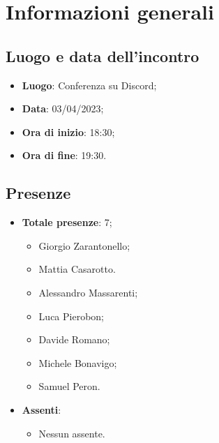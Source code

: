\section{Informazioni generali}

    \subsection{Luogo e data dell'incontro}
    \begin{itemize}
        \item \textbf{Luogo}: Conferenza su Discord;
        \item \textbf{Data}: 03/04/2023;
        \item \textbf{Ora di inizio}: 18:30;
        \item \textbf{Ora di fine}: 19:30.
    \end{itemize}
    \subsection{Presenze}
    \begin{itemize}
        \item \textbf{Totale presenze}: 7;
        \begin{itemize}
            \item Giorgio Zarantonello;
            \item Mattia Casarotto.
            \item Alessandro Massarenti;
            \item Luca Pierobon;
            \item Davide Romano;
            \item Michele Bonavigo;
            \item Samuel Peron.
        \end{itemize}
        \item \textbf{Assenti}:
        \begin{itemize}
            \item Nessun assente.
        \end{itemize}
    \end{itemize}